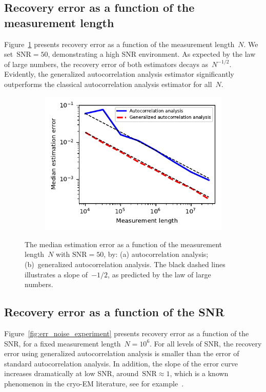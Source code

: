 \documentclass{article}
\begin{document}
\subsection{Recovery error as a function of the measurement length}
\label{subsec:exp_size}
Figure~\ref{fig:err_size_experiment} presents recovery error as a function of the measurement length~$N$. We set~\mbox{$\text{SNR} = 50$}, demonstrating a high SNR environment. As expected by the law of large numbers, the recovery error of both estimators decays as~$N^{-1/2}$. Evidently, the generalized autocorrelation analysis estimator significantly outperforms {the} classical autocorrelation analysis estimator for all~$N$.

\begin{figure}[!tb]
	\begin{subfigure}[ht]{\columnwidth}
		\centering
		\includegraphics[width=0.8\columnwidth, keepaspectratio]{figures/experiment_size_err.pdf}
	\end{subfigure}
	\caption{The median estimation error as a function of the measurement length~$N$ with $\text{SNR}=50$, by: (a) autocorrelation analysis; (b)~generalized autocorrelation analysis. {The black dashed lines illustrates a slope of~$-1/2$, as predicted by the law of large numbers.}}
	\label{fig:err_size_experiment}
\end{figure}

\subsection{Recovery error as a function of the SNR}
\label{subsec:exp_SNR}
Figure~\ref{fig:err_noise_experiment} presents recovery error as a function of {the} SNR, for a fixed measurement length~$N = 10^6$. For all levels of SNR, the recovery error using  generalized autocorrelation analysis  is smaller than the error of standard autocorrelation analysis. In addition, the slope of the error curve increases dramatically at low SNR, around~\mbox{$\text{SNR} \approx 1$}, which is a known phenomenon in the \mbox{cryo-EM} literature, see for example~\cite{sigworth1998maximum,abbe2018multireference,perry2019sample}.
\end{document}
